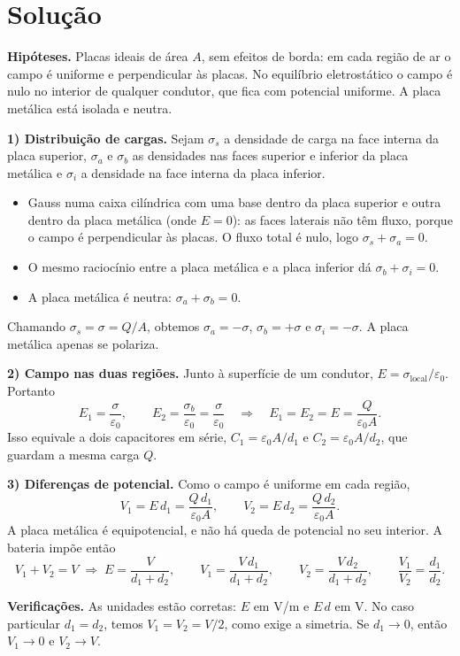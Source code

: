 \documentclass{article}%
\begin{document}
\section*{Solução}

\textbf{Hipóteses.} Placas ideais de área $A$, sem efeitos de borda: em cada região de ar o campo é uniforme e perpendicular às placas. No equilíbrio eletrostático o campo é nulo no interior de qualquer condutor, que fica com potencial uniforme. A placa metálica está isolada e neutra.

\textbf{1) Distribuição de cargas.} Sejam $\sigma_s$ a densidade de carga na face interna da placa superior, $\sigma_a$ e $\sigma_b$ as densidades nas faces superior e inferior da placa metálica e $\sigma_i$ a densidade na face interna da placa inferior.

\begin{itemize}
\item Gauss numa caixa cilíndrica com uma base dentro da placa superior e outra dentro da placa metálica (onde $E=0$): as faces laterais não têm fluxo, porque o campo é perpendicular às placas. O fluxo total é nulo, logo $\sigma_s+\sigma_a=0$.
\item O mesmo raciocínio entre a placa metálica e a placa inferior dá $\sigma_b+\sigma_i=0$.
\item A placa metálica é neutra: $\sigma_a+\sigma_b=0$.
\end{itemize}
Chamando $\sigma_s=\sigma=Q/A$, obtemos $\sigma_a=-\sigma$, $\sigma_b=+\sigma$ e $\sigma_i=-\sigma$. A placa metálica apenas se polariza.

\textbf{2) Campo nas duas regiões.} Junto à superfície de um condutor, $E=\sigma_{\text{local}}/\varepsilon_0$. Portanto
\[
E_1=\frac{\sigma}{\varepsilon_0}, \qquad E_2=\frac{\sigma_b}{\varepsilon_0}=\frac{\sigma}{\varepsilon_0}
\quad\Longrightarrow\quad E_1=E_2=E=\frac{Q}{\varepsilon_0 A}.
\]
Isso equivale a dois capacitores em série, $C_1=\varepsilon_0A/d_1$ e $C_2=\varepsilon_0A/d_2$, que guardam a mesma carga $Q$.

\textbf{3) Diferenças de potencial.} Como o campo é uniforme em cada região,
\[
V_1=E\,d_1=\frac{Q\,d_1}{\varepsilon_0 A}, \qquad V_2=E\,d_2=\frac{Q\,d_2}{\varepsilon_0 A}.
\]
A placa metálica é equipotencial, e não há queda de potencial no seu interior. A bateria impõe então
\[
V_1+V_2=V \;\Longrightarrow\; E=\frac{V}{d_1+d_2}, \qquad
V_1=\frac{V\,d_1}{d_1+d_2}, \qquad V_2=\frac{V\,d_2}{d_1+d_2}, \qquad \frac{V_1}{V_2}=\frac{d_1}{d_2}.
\]

\textbf{Verificações.} As unidades estão corretas: $E$ em V/m e $E\,d$ em V. No caso particular $d_1=d_2$, temos $V_1=V_2=V/2$, como exige a simetria. Se $d_1\to 0$, então $V_1\to 0$ e $V_2\to V$.
\end{document}

